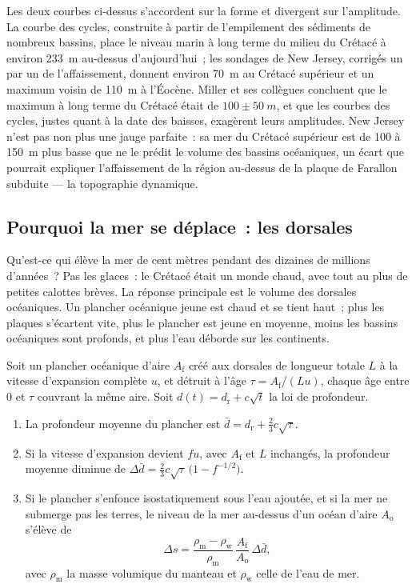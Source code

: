 Les deux courbes ci-dessus s'accordent sur la forme et divergent sur l'amplitude. La courbe des cycles,
construite à partir de l'empilement des sédiments de nombreux bassins, place le niveau marin à long terme
du milieu du Crétacé à environ \qty{233}{m} au-dessus d'aujourd'hui~; les sondages de New Jersey, corrigés
un par un de l'affaissement, donnent environ \qty{70}{m} au Crétacé supérieur et un maximum voisin de
\qty{110}{m} à l'Éocène. Miller et ses collègues concluent que le maximum à long terme du Crétacé était de
$100 \pm \qty{50}{m}$, et que les courbes des cycles, justes quant à la date des baisses, exagèrent leurs
amplitudes. New Jersey n'est pas non plus une jauge parfaite~: sa mer du Crétacé supérieur est de 100 à
\qty{150}{m} plus basse que ne le prédit le volume des bassins océaniques, un écart que pourrait expliquer
l'affaissement de la région au-dessus de la plaque de Farallon subduite --- la topographie dynamique.

\subsection*{Pourquoi la mer se déplace~: les dorsales}

Qu'est-ce qui élève la mer de cent mètres pendant des dizaines de millions d'années~? Pas les
glaces~: le Crétacé était un monde chaud, avec tout au plus de petites calottes brèves. La
réponse principale est le volume des dorsales océaniques. Un plancher océanique jeune est
chaud et se tient haut~; plus les plaques s'écartent vite, plus le plancher est jeune en
moyenne, moins les bassins océaniques sont profonds, et plus l'eau déborde sur les continents.

\begin{proposition}\label{prop:b2:phanerozoic-earth:ridge}
Soit un plancher océanique d'aire $A_{\text{f}}$ créé aux dorsales de longueur totale $L$ à la
vitesse d'expansion complète $u$, et détruit à l'âge $\tau = A_{\text{f}}/(Lu)$, chaque âge entre
0 et $\tau$ couvrant la même aire. Soit $d(t) = d_{\text{r}} + c\sqrt t$ la loi de profondeur.
\begin{enumerate}
  \item La profondeur moyenne du plancher est $\bar d = d_{\text{r}} + \tfrac23 c\sqrt\tau$.
  \item Si la vitesse d'expansion devient $fu$, avec $A_{\text{f}}$ et $L$ inchangés, la profondeur moyenne diminue de
        $\Delta\bar d = \tfrac23 c\sqrt\tau\,\bigl(1 - f^{-1/2}\bigr)$.
  \item Si le plancher s'enfonce isostatiquement sous l'eau ajoutée, et si la mer ne submerge pas les terres,
        le niveau de la mer au-dessus d'un océan d'aire $A_{\text{o}}$ s'élève de
        \[
        \Delta s = \frac{\rho_{\text{m}} - \rho_{\text{w}}}{\rho_{\text{m}}}\,
        \frac{A_{\text{f}}}{A_{\text{o}}}\,\Delta\bar d ,
        \]
        avec $\rho_{\text{m}}$ la masse volumique du manteau et $\rho_{\text{w}}$ celle de l'eau de mer.
\end{enumerate}
\end{proposition}

